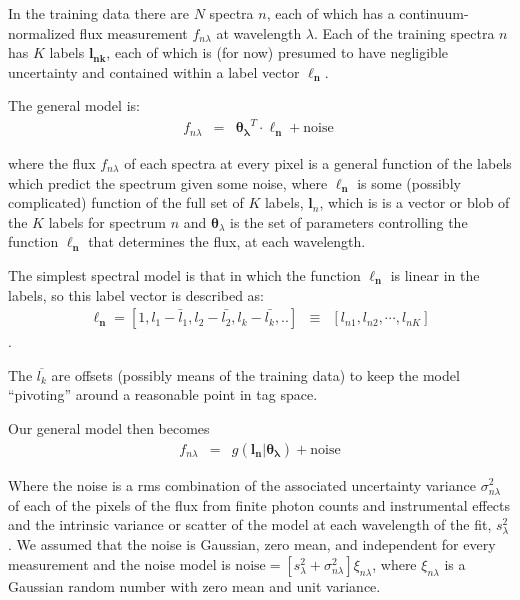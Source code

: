\documentclass[12pt, preprint]{aastex}
\newcommand{\set}[1]{\bm{#1}}
\newcommand{\mean}[1]{\overline{#1}}
\begin{document}
In the training data there are $N$ spectra $n$, each of which has
a continuum-normalized flux measurement $f_{n\lambda}$ at wavelength
$\lambda$. Each of the training spectra $n$ has $K$ labels $\boldsymbol{l_{nk}}$, each of which
is (for now) presumed to have negligible uncertainty and contained within a label vector $\boldsymbol{\ell_n}$.

The general model is:
\begin{eqnarray}
f_{n\lambda} &=&
\boldsymbol{\theta_\lambda}^T \cdot \boldsymbol{\ell_n} + \mbox{noise}
\
\end{eqnarray}

where the flux $f_{n\lambda}$ of each spectra at every pixel is a general function of the labels which predict the spectrum given some noise, where $\boldsymbol{\ell_n}$ is some (possibly complicated) function of the full set of $K$ labels, $\set{l}_n$, which is is a vector or blob of the $K$ labels for spectrum $n$ and $\set{\theta}_\lambda$ is the set of parameters controlling the function $\boldsymbol{\ell_n}$ that determines the flux, at each wavelength.

The simplest spectral model is that in which the function $\boldsymbol{\ell_n}$ is
linear in the labels, so this label vector is described as:
\begin{eqnarray}
\set{\ell_n} =  [1, l_1 - \bar{l}_1, l_2 - \bar{l_2}, l_k - \bar{l_k}, .. ] &\equiv& [l_{n1}, l_{n2}, \cdots, l_{nK}]
\label{eq:linear}
\end{eqnarray}.

The $\mean{l_k}$ are offsets (possibly means of the training data) to keep the model ``pivoting'' around a reasonable point in tag space.


Our general model then becomes
\begin{eqnarray}
f_{n\lambda} &=&
g(\boldsymbol{l_n} |  \boldsymbol{\theta_\lambda}) + \mbox{noise}
\end{eqnarray}

Where the noise is a rms combination of the associated uncertainty variance
$\sigma_{n\lambda}^2$ of each of the pixels of the flux from finite photon counts and instrumental effects and the intrinsic variance or scatter of the model at each wavelength of the fit, $s_\lambda^2$. We assumed that the noise is Gaussian, zero mean, and independent for every measurement and the noise model is $\mbox{noise} = [s_\lambda^2+ \sigma_{n\lambda}^2]\xi_{n\lambda}$, where $\xi_{n\lambda}$ is a Gaussian random number with zero mean and unit
variance.
\end{document}
